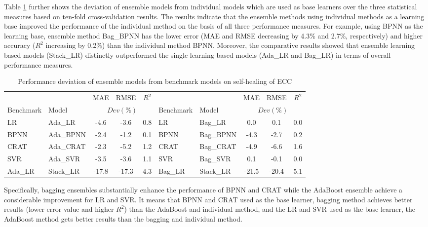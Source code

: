 \documentclass[11pt]{article}
\begin{document}
	Table \ref{com} further shows the deviation of ensemble models from individual models which are used as base learners over the three statistical measures based on ten-fold cross-validation results. The results indicate that the ensemble methods using individual methods as a learning base improved the performance of the individual method on the basis of all three performance measures. For example, using BPNN as the learning base, ensemble method Bag\_BPNN has the lower error (MAE and RMSE decreasing by 4.3\% and 2.7\%, respectively) and higher accuracy ($R^2$ increasing by 0.2\%) than the individual method BPNN. Moreover, the comparative results showed that ensemble learning based models (Stack\_LR) distinctly outperformed the single learning based models (Ada\_LR and Bag\_LR) in terms of overall performance measures.
	
	\begin{table}[!h]
		\small
		\centering
		\caption{Performance deviation of ensemble models from benchmark models on self-healing of ECC }
		\begin{tabular*}{0.9\textwidth}{llccc|llccc}
			\toprule
			&	&	MAE	&	RMSE	&	$R^2$	&	&	&	MAE	&	RMSE	&	$R^2$	\\
			\cmidrule{3-5} \cmidrule{8-10}
			Benchmark & Model& \multicolumn{3}{c|}{$Dev (\%)$} &Benchmark & Model& \multicolumn{3}{c}{$Dev (\%)$} \\
			\midrule
			LR	&	Ada\_LR	&	-4.6	&	-3.6	&	0.8		&	LR	&	Bag\_LR	&	0.0	&	0.1	&	0.0	\\
			BPNN	&	Ada\_BPNN	&	-2.4	&	-1.2	&	0.1	&	BPNN	&	Bag\_BPNN	&	-4.3	&	-2.7	&	0.2	\\
			CRAT	&	Ada\_CRAT	&-2.3	&	-5.2	&	1.2	&	CRAT	&	Bag\_CRAT	&	-4.9	&	-6.6	&	1.6\\
			SVR	&	Ada\_SVR&-3.5	&	-3.6&	1.1	&	SVR	&	Bag\_SVR	&	0.1	&	-0.1	&	0.0	\\
			\midrule
			Ada\_LR	&	Stack\_LR	&	-17.8&	-17.3&	4.3	&	Bag\_LR	&	Stack\_LR	&-21.5	&	-20.4&	5.1 \\
			\bottomrule 
		\end{tabular*}
		\label{com}
	\end{table} 
	
	
	
	Specifically, bagging ensembles substantially enhance the performance of BPNN and CRAT while the AdaBoost ensemble achieve a considerable improvement for LR and SVR. It means that BPNN and CRAT used as the base learner, bagging method achieves better results (lower error value and higher $R^2$) than the AdaBoost and individual method, and the LR and SVR used as the base learner, the AdaBoost method gets better results than the bagging and individual method.
	
\end{document}
